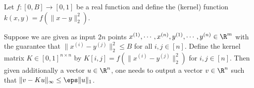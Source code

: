 \begin{definition}
Let $f: [0, B] \rightarrow [0, 1]$ be a real function and define the (kernel) function $k(x, y) = f(\|x-y\|_2^2)$.

Suppose we are given as input $2n$ points $x^{(1)}, \cdots, x^{(n)}, y^{(1)}, \cdots, y^{(n)} \in \R^m$ with the guarantee that $\|x^{(i)} - y^{(j)}\|_2^2 \le B$ for all $i, j \in [n]$.
Define the kernel matrix $K \in [0,1]^{n \times n}$ by $K[i, j] = f(\|x^{(i)}- y^{(j)}\|_2^2)$ for $i, j \in [n]$.
Then given additionally a vector $u \in \R^n$, one needs to output a vector $v \in \R^n$ such that
$\|v - K u\|_{\infty} \le \eps\|u\|_{1}$.
\end{definition}






















































































